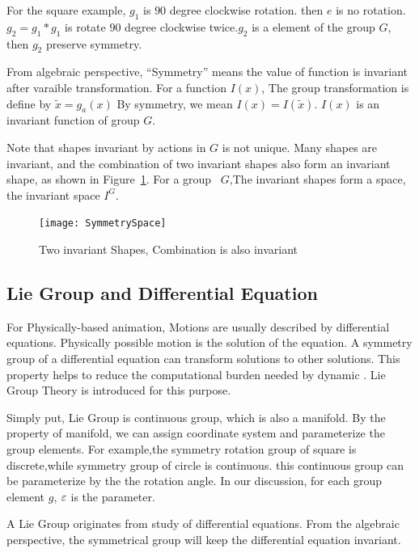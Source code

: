 For the square example, $g_1$ is  $90$ degree clockwise rotation. then $e$ is no rotation.
$g_2=g_1*g_1$ is rotate $90$ degree clockwise twice.$g_2$ is a element of the group $G$, then $g_2$ preserve symmetry.


From algebraic perspective, ``Symmetry'' means the value of function is invariant after varaible transformation.
For a function $I(x)$,
The group transformation is define by $\tilde{x}=g_a(x)$
By symmetry, we mean $I(x)=I(\tilde{x})$.
$I(x)$ is an invariant function of group $G$.

Note that  shapes invariant by actions in $G$ is not unique.
Many shapes are invariant, and the combination of two invariant shapes also form an invariant shape, as shown in Figure~\ref{fig:SymmetrySpace}. 
For a group ~$G$,The invariant shapes form a space, the invariant space $I^G$.


\begin{figure}[!htbp]
  \begin{center}
    \texttt{[image: SymmetrySpace]}
    \caption{Two invariant Shapes, Combination is also invariant}
    \label{fig:SymmetrySpace}
\end{center}
\end{figure}





\subsection{Lie Group and Differential Equation}
For Physically-based animation,
Motions are usually described by differential equations.
Physically possible motion is the solution of the equation.
A symmetry group of a differential equation can transform solutions to other solutions.
This property helps to reduce the computational burden needed by dynamic \cms.
Lie Group Theory is introduced for this purpose.




Simply put, Lie Group is continuous group, which is also a manifold.
By the property of manifold, we can assign coordinate system and parameterize the group elements.
For example,the symmetry rotation group of square is discrete,while symmetry group of circle is continuous.
this continuous group can be parameterize by the the rotation angle.
In our discussion, for each group element $g$, $\varepsilon$ is the parameter.

A Lie Group originates from study of differential equations.
From the algebraic perspective, the symmetrical group will keep the differential equation invariant.

